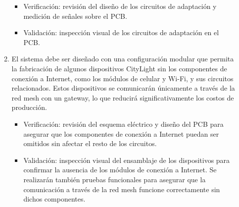 \documentclass[
11pt, %
]{charter}
\begin{document}
\begin{enumerate}
\begin{enumerate}
\begin{itemize}
				\item Verificación: revisión del diseño de los circuitos de adaptación y medición de señales sobre el PCB.
				\item Validación: inspección visual de los circuitos de adaptación en el PCB.
				\end{itemize}
			\item El sistema debe ser diseñado con una configuración modular que permita la fabricación de algunos dispositivos CityLight sin los componentes de conexión a Internet, como los módulos de celular y Wi-Fi, y sus circuitos relacionados. Estos dispositivos se comunicarán únicamente a través de la red mesh con un gateway, lo que reducirá significativamente los costos de producción.
				\begin{itemize}
				\item Verificación: revisión del esquema eléctrico y diseño del PCB para asegurar que los componentes de conexión a Internet puedan ser omitidos sin afectar el resto de los circuitos.
				\item Validación:  inspección visual del ensamblaje de los dispositivos para confirmar la ausencia de los módulos de conexión a Internet. Se realizarán también pruebas funcionales para asegurar que la comunicación a través de la red mesh funcione correctamente sin dichos componentes.
				\end{itemize}
		\end{enumerate}


\end{enumerate}
\end{document}
